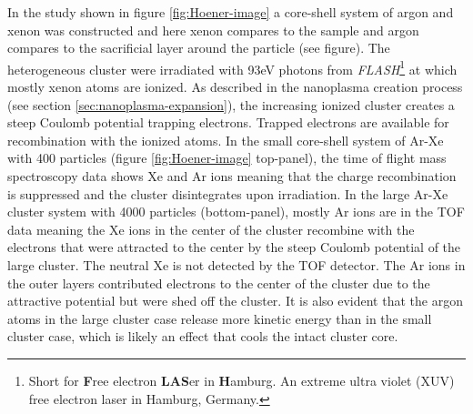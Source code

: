 In the study shown in figure \ref{fig:Hoener-image} a core-shell system of argon and xenon was constructed and here xenon compares to the sample and argon compares to the sacrificial layer around the particle (see figure). The heterogeneous cluster were irradiated with 93eV photons from \textit{FLASH}\footnote{Short for \textbf{F}ree electron \textbf{LAS}er in \textbf{H}amburg. An extreme ultra violet (XUV) free electron laser in Hamburg, Germany.} at which mostly xenon atoms are ionized. As described in the nanoplasma creation process (see section \ref{sec:nanoplasma-expansion}), the increasing ionized cluster creates a steep Coulomb potential trapping electrons. Trapped electrons are available for recombination with the ionized atoms. In the small core-shell system of Ar-Xe with 400 particles (figure \ref{fig:Hoener-image} top-panel), the time of flight mass spectroscopy data shows Xe and Ar ions meaning that the charge recombination is suppressed and the cluster disintegrates upon irradiation. In the large Ar-Xe cluster system with 4000 particles (bottom-panel), mostly Ar ions are in the TOF data meaning the Xe ions in the center of the cluster recombine with the electrons that were attracted to the center by the steep Coulomb potential of the large cluster. The neutral Xe is not detected by the TOF detector. The Ar ions in the outer layers contributed electrons to the center of the cluster due to the attractive potential but were shed off the cluster. It is also evident that the argon atoms in the large cluster case release more kinetic energy than in the small cluster case, which is likely an effect that cools the intact cluster core.
%
%
%
%